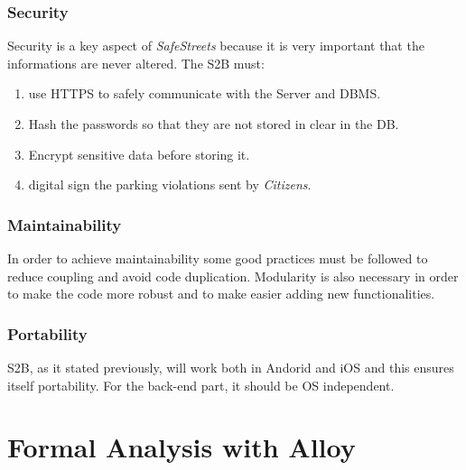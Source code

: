 \documentclass{article}
\begin{document}
\subsubsection{Security}
Security is a key aspect of \textit{SafeStreets} because it is very important that the informations are never altered.
The S2B must:
\begin{enumerate}
 \item use HTTPS to safely communicate with the Server and DBMS.    
 \item Hash the passwords so that they are not stored in clear in the DB.
 \item Encrypt sensitive data before storing it.
 \item digital sign the parking violations sent by \textit{Citizens}.  
\end{enumerate} 

\subsubsection{Maintainability}
In order to achieve maintainability some good practices must be followed to reduce coupling and avoid code duplication.
Modularity is also necessary in order to make the code more robust and to make easier adding new functionalities.

\subsubsection{Portability}
S2B, as it stated previously, will work both in Andorid and iOS and this ensures itself portability. For 
the back-end part, it should be OS independent.

\clearpage


\section{Formal Analysis with Alloy}
\end{document}

